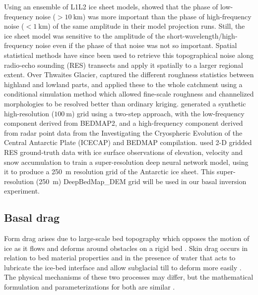 Using an ensemble of L1L2 \citep{Hindmarshnumericalcomparisonapproximations2004,SchoofThinFilmFlowsWall2010} ice sheet models, \citet{SunDynamicresponseAntarctic2014} showed that the phase of low-frequency noise ($>\SI{10}{\kilo\metre}$) was more important than the phase of high-frequency noise ($<\SI{1}{\kilo\metre}$) of the same amplitude in their model projection runs.
Still, the ice sheet model was sensitive to the amplitude of the short-wavelength/high-frequency noise even if the phase of that noise was not so important.
Spatial statistical methods have since been used to retrieve this topographical noise along radio-echo sounding (\gls{RES}) transects and apply it spatially to a larger regional extent.
Over Thwaites Glacier, \citet{GoffConditionalsimulationThwaites2014} captured the different roughness statistics between highland and lowland parts, and applied these to the whole catchment using a conditional simulation method which allowed fine-scale roughness and channelized morphologies to be resolved better than ordinary kriging.
\citet{Grahamhighresolutionsyntheticbed2017} generated a synthetic high-resolution ($\SI{100}{\metre}$) grid using a two-step approach, with the low-frequency component derived from BEDMAP2, and a high-frequency component derived from radar point data from the Investigating the Cryospheric Evolution of the Central Antarctic Plate (ICECAP) and BEDMAP compilation.
\citet{LeongDeepBedMapsuperresolutiondeep2019} used 2-D gridded \gls{RES} ground-truth data with ice surface observations of elevation, velocity and snow accumulation to train a super-resolution deep neural network model, using it to produce a \SI{250}{\metre} resolution grid of the Antarctic ice sheet.
This super-resolution (\SI{250}{\metre}) DeepBedMap\_DEM grid \citep[version 1.1,][]{LeongDeepBedMap2020} will be used in our basal inversion experiment.



\subsection{Basal drag}


Form drag arises due to large-scale bed topography which opposes the motion of ice as it flows and deforms around obstacles on a rigid bed \citep[][]{WeertmanSlidingGlaciers1957,SchoofBasalperturbationsice2002}.
Skin drag occurs in relation to bed material properties and in the presence of water that acts to lubricate the ice-bed interface and allow subglacial till to deform more easily \citep{IversonExperimentsdynamicssedimentary2015}.
The physical mechanisms of these two processes may differ, but the mathematical formulation and parameterizations for both are similar \citep[Fig.~\ref{fig:1.3},][]{Minchewuniversalglacierslip2020}.

